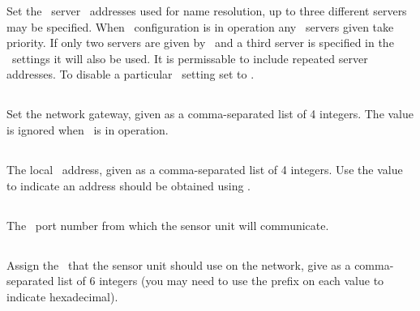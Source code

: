 Set the \dns\ server \ip\ addresses used for name resolution, up to
three different servers may be specified. When \dhcp\ configuration is
in operation any \dns\ servers given take priority. If only two
servers are given by \dhcp\ and a third server is specified in the
\eeprom\ settings it will also be used. It is permissable to include
repeated server addresses. To disable a particular \dns\ setting set
to .

\subsection[gateway]{}

Set the network gateway, given as a comma-separated list of 4
integers. The value is ignored when \dhcp\ is in operation.

\subsection[local-ip-address]{}

The local \ip\ address, given as a comma-separated list of 4
integers. Use the value  to indicate an
address should be obtained using \dhcp.

\subsection[local-ip-port]{}
The \udp\ port number from which the sensor unit will communicate.

\subsection[local-mac-address]{}

Assign the \macAddress\ that the sensor unit should use on the
network, give as a comma-separated list of 6 integers (you may need to use the
 prefix on each value to indicate hexadecimal).

\subsection[netmask]{}

